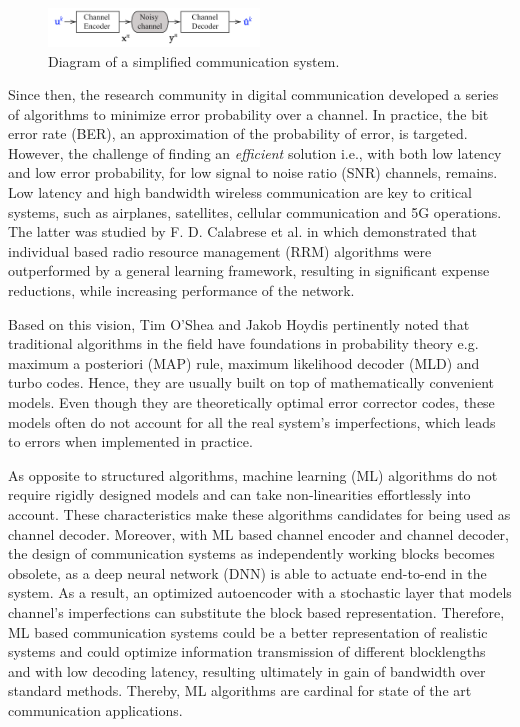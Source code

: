 \documentclass[conference]{IEEEtran}
\begin{document}
\begin{figure}[!ht]
  \centering
    \includegraphics[width=0.5\textwidth]{simple_sys}
    \caption{Diagram of a simplified communication system.}\label{fig:cs}
\end{figure}

Since then, the research community in digital communication developed a series of algorithms to minimize error probability over a channel. In practice, the bit error rate (BER), an approximation of the probability of error, is targeted. However, the challenge of finding an \textit{efficient} solution  i.e., with both low latency and low error probability, for low signal to noise ratio (SNR) channels, remains. Low latency and high bandwidth wireless communication are key to critical systems, such as airplanes, satellites, cellular communication and 5G operations. The latter was studied by F. D. Calabrese et al. in \cite{b3} which  demonstrated that individual based radio resource management (RRM) algorithms were outperformed by a general learning framework, resulting in significant expense reductions, while increasing performance of the network.

Based on this vision, Tim O'Shea and Jakob Hoydis \cite{b2} pertinently noted that traditional algorithms in the field have foundations in probability theory e.g. maximum a posteriori (MAP) rule, maximum likelihood decoder (MLD) and turbo codes. Hence, they are usually built on top of mathematically convenient models. Even though they are theoretically optimal error corrector codes, these models often do not account for all the real system's imperfections, which leads to errors when implemented in practice.

As opposite to structured algorithms, machine learning (ML) algorithms do not require rigidly designed models and can take non-linearities effortlessly into account. These characteristics make these algorithms candidates for being used as channel decoder. Moreover, with ML based channel encoder and channel decoder, the design of communication systems as independently working blocks becomes obsolete, as a deep neural network (DNN) is able to actuate end-to-end in the system. As a result, an optimized autoencoder with a stochastic layer that models channel's imperfections can substitute the block based representation. Therefore, ML based communication systems could be a better representation of realistic systems and could optimize information transmission of different blocklengths and with low decoding latency, resulting ultimately in gain of bandwidth over standard methods. Thereby, ML algorithms are cardinal for state of the art communication applications. 
\end{document}
